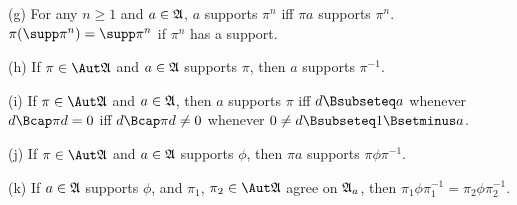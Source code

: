 (g) For any $n\ge 1$ and $a\in\frak A$, $a$ supports $\pi^n$ iff $\pi a$
supports $\pi^n$.    $\pi(\supp\pi^n)=\supp\pi^n$
if $\pi^n$ has a support.

(h) If $\pi\in\Aut\frak A$ and $a\in\frak A$ supports $\pi$, then $a$
supports $\pi^{-1}$.

(i) If $\pi\in\Aut\frak A$ and $a\in\frak A$, then $a$ supports $\pi$
iff $d\Bsubseteq a$ whenever $d\Bcap\pi d=0$ iff $d\Bcap\pi d\ne 0$
whenever $0\ne d\Bsubseteq 1\Bsetminus a$.

(j) If $\pi\in\Aut\frak A$ and $a\in\frak A$ supports $\phi$, then
$\pi a$ supports $\pi\phi\pi^{-1}$.

(k) If $a\in\frak A$ supports $\phi$, and $\pi_1$, $\pi_2\in\Aut\frak A$
agree on $\frak A_a$, then $\pi_1\phi\pi_1^{-1}=\pi_2\phi\pi_2^{-1}$.


